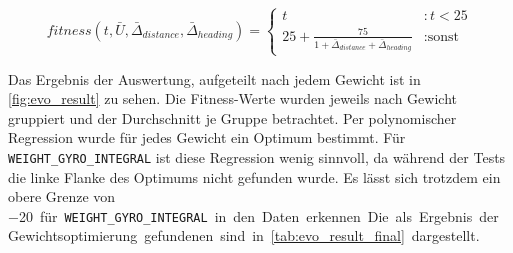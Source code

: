 \documentclass[oneside,abstractoff,a4paper]{scrartcl}
\begin{document}
\begin{equation}\label{eq:fitness}
fitness(t, \bar{U},\bar{\Delta}_{distance},\bar{\Delta}_{heading}) =
\begin{cases}
	t &: t < 25\\
    25 + \frac{75}{1 + \bar{\Delta}_{distance} + \bar{\Delta}_{heading}} &: \text{sonst}
\end{cases}
\end{equation}

Das Ergebnis der Auswertung, aufgeteilt nach jedem Gewicht ist in \cref{fig:evo_result} zu sehen. Die Fitness-Werte wurden jeweils nach Gewicht gruppiert und der Durchschnitt je Gruppe betrachtet. Per polynomischer Regression wurde für jedes Gewicht ein Optimum bestimmt. Für \texttt{WEIGHT\_GYRO\_INTEGRAL} ist diese Regression wenig sinnvoll, da während der Tests die linke Flanke des Optimums nicht gefunden wurde. Es lässt sich trotzdem ein obere Grenze von \SI{-20} für \texttt{WEIGHT\_GYRO\_INTEGRAL} in den Daten erkennen.

Die als Ergebnis der Gewichtsoptimierung gefundenen sind in \cref{tab:evo_result_final} dargestellt.
\end{document}
